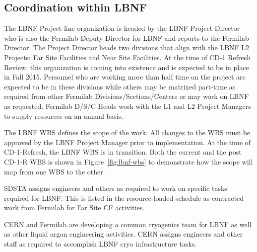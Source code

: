 \subsection{Coordination within LBNF}


The LBNF Project line organization is headed by the LBNF Project Director who is also the Fermilab Deputy Director for LBNF and reports to the Fermilab Director. The Project Director heads two divisions 
that align with the LBNF L2 Projects: Far Site Facilities and Near Site Facilities. At the time of CD-1 Refresh Review, this organization is %
coming into existence and is expected to be in place in Fall 2015. Personnel who are working more than half time on the project are expected to be in these divisions while others may be matrixed part-time as required from other Fermilab Divisions/Sections/Centers or may work on LBNF as requested. Fermilab D/S/C Heads work with the L1 and L2 Project Managers to supply resources on an annual basis. 

The LBNF WBS defines the scope of the work. All changes to the WBS must be approved by the LBNF Project Manager prior to implementation. At the time of CD-1-Refresh, the LBNF WBS is in transition. Both the current and the post CD-1-R WBS is shown in Figure~\ref{fig:lbnf-wbs} to demonstrate how the scope will map from one WBS to the other. 

SDSTA assigns engineers and others as required to work on specific tasks required  for LBNF. This is listed in the resource-loaded schedule as contracted work from Fermilab for Far Site CF activities. 

CERN and Fermilab are developing a common cryogenics team for LBNF as well as other liquid argon engineering activities. CERN assigns engineers and other staff as required to accomplish LBNF cryo infrastructure tasks. 




